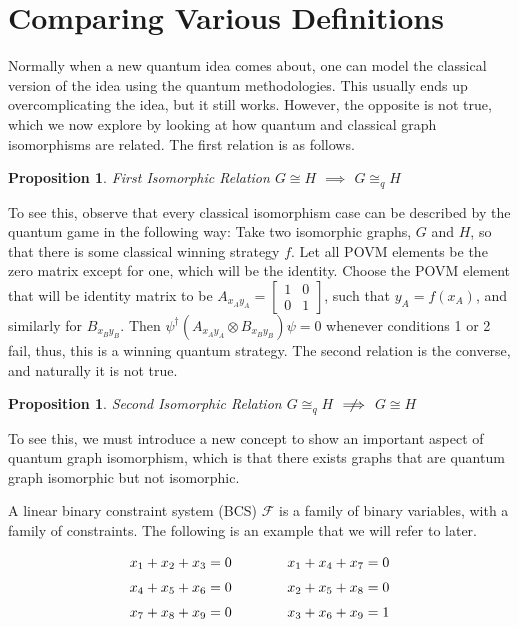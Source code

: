 \documentclass[12pt]{article}
\newtheorem{proposition}[thm]{Proposition}
\begin{document}
\section{Comparing Various Definitions}
Normally when a new quantum idea comes about, one can model the classical version of the idea using the quantum methodologies. This usually ends up overcomplicating the idea, but it still works. However, the opposite is not true, which we now explore by looking at how quantum and classical graph isomorphisms are related. The first relation is as follows.

\begin{proposition}{First Isomorphic Relation}
\label{prop:isoimpliesqiso}
$G \cong H$ $\implies$ $G \cong_q H$
\end{proposition}
To see this, observe that every classical isomorphism case can be described by the quantum game in the following way: Take two isomorphic graphs, $G$ and $H$, so that there is some classical winning strategy $f$. Let all POVM elements be the zero matrix except for one, which will be the identity. Choose the POVM element that will be identity matrix to be $A_{x_Ay_A} = 
\begin{bmatrix}
1 & 0 \\
0 & 1
\end{bmatrix}$, such that $y_A = f(x_A)$, and similarly for $B_{x_By_B}$. Then $\psi^\dag(A_{x_Ay_A} \otimes B_{x_By_B})\psi = 0$ whenever conditions 1 or 2 fail, thus, this is a winning quantum strategy.
The second relation is the converse, and naturally it is not true.
\begin{proposition}{Second Isomorphic Relation}
$G \cong_q H$ $\centernot\implies$ $G \cong H$
\end{proposition}
To see this, we must introduce a new concept to show an important aspect of quantum graph isomorphism, which is that there exists graphs that are quantum graph isomorphic but not isomorphic.

A linear binary constraint system (BCS) $\mathcal{F}$ is a family of binary variables, with a family of constraints. The following is an example that we will refer to later.

\begin{equation*}
\label{bcs}
\openup\jot %
\begin{aligned}[t]
x_1 + x_2 + x_3 &= 0 \\
x_4 + x_5 + x_6 &= 0 \\
x_7 + x_8 + x_9 &= 0
\end{aligned}
\qquad\qquad %
\begin{aligned}[t]
x_1 + x_4 + x_7 &= 0 \\
x_2 + x_5 + x_8 &= 0 \\
x_3 + x_6 + x_9 &= 1
\end{aligned}
\end{equation*}
\end{document}
